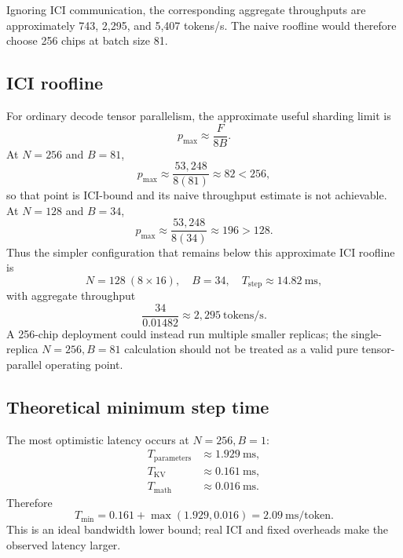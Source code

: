 \documentclass[11pt]{article}
\begin{document}
Ignoring ICI communication, the corresponding aggregate throughputs are
approximately 743, 2,295, and 5,407 tokens/s. The naive roofline would
therefore choose 256 chips at batch size 81.

\subsection*{ICI roofline}

For ordinary decode tensor parallelism, the approximate useful sharding
limit is
\[
p_{\max}\approx\frac{F}{8B}.
\]
At \(N=256\) and \(B=81\),
\[
p_{\max}\approx\frac{53{,}248}{8(81)}\approx82<256,
\]
so that point is ICI-bound and its naive throughput estimate is not
achievable. At \(N=128\) and \(B=34\),
\[
p_{\max}\approx\frac{53{,}248}{8(34)}\approx196>128.
\]
Thus the simpler configuration that remains below this approximate ICI
roofline is
\[
\boxed{N=128\ (8\times16),\quad B=34,\quad
T_{\mathrm{step}}\approx14.82\ \text{ms}},
\]
with aggregate throughput
\[
\boxed{\frac{34}{0.01482}\approx2{,}295\ \text{tokens/s}}.
\]
A 256-chip deployment could instead run multiple smaller replicas; the
single-replica \(N=256,B=81\) calculation should not be treated as a valid
pure tensor-parallel operating point.

\subsection*{Theoretical minimum step time}

The most optimistic latency occurs at \(N=256,B=1\):
\begin{align*}
T_{\mathrm{parameters}}&\approx1.929\ \text{ms},\\
T_{\mathrm{KV}}&\approx0.161\ \text{ms},\\
T_{\mathrm{math}}&\approx0.016\ \text{ms}.
\end{align*}
Therefore
\[
T_{\min}
=0.161+\max(1.929,0.016)
=\boxed{2.09\ \text{ms/token}}.
\]
This is an ideal bandwidth lower bound; real ICI and fixed overheads make
the observed latency larger.
\end{document}
